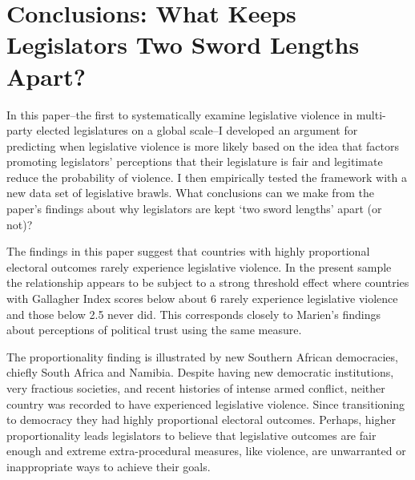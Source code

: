 \documentclass[a4paper]{article}\usepackage{graphicx, color}
\begin{document}
\section*{Conclusions: What Keeps Legislators Two Sword Lengths Apart?}

In this paper--the first to systematically examine legislative violence in multi-party elected legislatures on a global scale--I developed an argument for predicting when legislative violence is more likely based on the idea that factors promoting legislators' perceptions that their legislature is fair and legitimate reduce the probability of violence. I then empirically tested the framework with a new data set of legislative brawls. What conclusions can we make from the paper's findings about why legislators are kept `two sword lengths' apart (or not)?

The findings in this paper suggest that countries with highly proportional electoral outcomes rarely experience legislative violence. In the present sample the relationship appears to be subject to a strong threshold effect where countries with Gallagher Index scores below about 6 rarely experience legislative violence and those below 2.5 never did. This corresponds closely to Marien's \citeyearpar{Marien2011} findings about perceptions of political trust using the same measure. 

The proportionality finding is illustrated by new Southern African democracies, chiefly South Africa and Namibia. Despite having new democratic institutions, very fractious societies, and recent histories of intense armed conflict, neither country was recorded to have experienced legislative violence. Since transitioning to democracy they had highly proportional electoral outcomes. Perhaps, higher proportionality leads legislators to believe that legislative outcomes are fair enough and extreme extra-procedural measures, like violence, are unwarranted or inappropriate ways to achieve their goals.    
\end{document}
